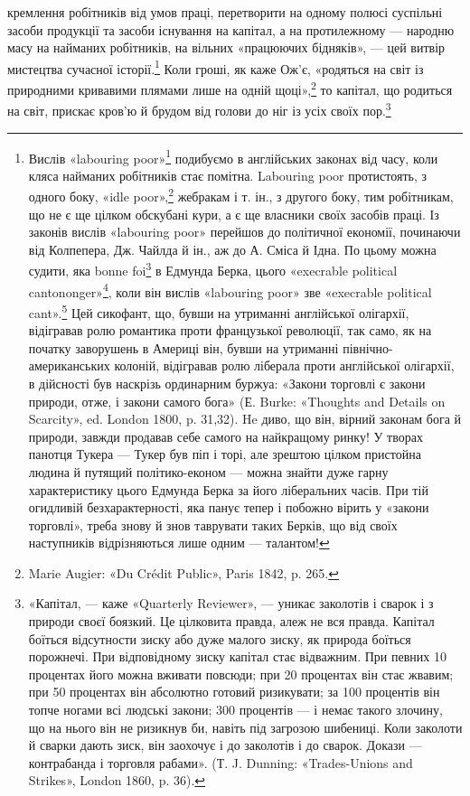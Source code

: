 кремлення робітників від умов праці, перетворити на одному
полюсі суспільні засоби продукції та засоби існування на капітал,
а на протилежному — народню масу на найманих робітників,
на вільних «працюючих бідняків», — цей витвір мистецтва
сучасної історії.\footnote{
Вислів «labouring poor»\footnote*{
— працюючі бідняки. Peд.
} подибуємо в англійських законах від
часу, коли кляса найманих робітників стає помітна. Labouring poor протистоять,
з одного боку, «idle poor»,\footnote*{
— біднякам-неробам. Peд.
} жебракам і т. ін., з другого боку,
тим робітникам, що не є ще цілком обскубані кури, а є ще власники
своїх засобів праці. Із законів вислів «labouring poor» перейшов
до політичної економії, починаючи від Колпепера, Дж. Чайлда й ін.,
аж до А. Сміса й Ідна. По цьому можна судити, яка bonne foi\footnote*{
— сумлінність. Peд.
} в Едмунда
Берка, цього «execrable political cantononger»\footnote*{
— огидливого політичного крамаря. Peд.
}, коли він вислів
«labouring poor» зве «execrable political cant».\footnote*{
— огидливим політичним перекрученням. Ред.
} Цей сикофант, що,
бувши на утриманні англійської олігархії, відігравав ролю романтика проти
французької революції, так само, як на початку заворушень в Америці
він, бувши на утриманні північно-американських колоній, відігравав
ролю ліберала проти англійської олігархії, в дійсності був наскрізь ординарним
буржуа: «Закони торговлі є закони природи, отже, і закони самого
бога» (Е. Burke: «Thoughts and Details on Scarcity», ed. London
1800, p. 31,32). He диво, що він, вірний законам бога й природи, завжди
продавав себе самого на найкращому ринку! У творах панотця Тукера —
Тукер був піп і торі, але зрештою цілком пристойна людина й путящий
політико-економ — можна знайти дуже гарну характеристику цього
Едмунда Берка за його ліберальних часів. При тій огидливій безхарактерності,
яка панує тепер і побожно вірить у «закони торговлі», треба
знову й знов таврувати таких Берків, що від своїх наступників відрізняються
лише одним — талантом!
} Коли гроші, як каже Ож’є, «родяться на
світ із природними кривавими плямами лише на одній щоці»,\footnote{
Marie Augier: «Du Crédit Public», Paris 1842, p. 265.
}
то капітал, що родиться на світ, прискає кров’ю й брудом від
голови до ніг із усіх своїх пор.\footnote{
«Капітал, — каже «Quarterly Reviewer», — уникає заколотів
і сварок і з природи своєї боязкий. Це цілковита правда, алеж не вся
правда. Капітал боїться відсутности зиску або дуже малого зиску, як
природа боїться порожнечі. При відповідному зиску капітал стає відважним.
При певних 10 процентах його можна вживати повсюди; при 20 процентах
він стає жвавим; при 50 процентах він абсолютно готовий ризикувати;
за 100 процентів він топче ногами всі людські закони; 300 процентів
— і немає такого злочину, що на нього він не ризикнув би, навіть
під загрозою шибениці. Коли заколоти й сварки дають зиск, він заохочує
і до заколотів і до сварок. Докази — контрабанда і торговля рабами».
(Т. J. Dunning: «Trades-Unions and Strikes», London 1860, p. 36).
}

